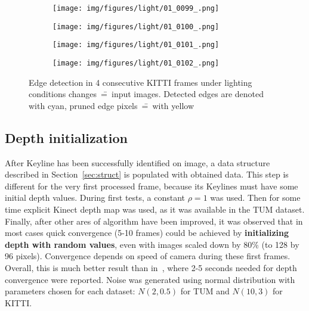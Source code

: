 \begin{figure}[hp]
	\centering
	\begin{subfigure}{1\textwidth}
		\centering
		\centering\texttt{[image: img/figures/light/01\_0099\_.png]}
		\subcaption{\label{fig:light2_a}}
	\end{subfigure}
	\begin{subfigure}{1\textwidth}
		\centering
		\centering\texttt{[image: img/figures/light/01\_0100\_.png]}
		\subcaption{\label{fig:light2_b}}
	\end{subfigure}
	\begin{subfigure}{1\textwidth}
		\centering
		\centering\texttt{[image: img/figures/light/01\_0101\_.png]}
		\subcaption{\label{fig:light2_c}}
	\end{subfigure}
	\begin{subfigure}{1\textwidth}
		\centering
		\centering\texttt{[image: img/figures/light/01\_0102\_.png]}
		\subcaption{\label{fig:light2_d}}
	\end{subfigure}
	
	\caption{\label{fig:light2}Edge detection in 4 consecutive KITTI \cite{kitti} frames under lighting conditions changes~\==~input images. Detected edges are denoted with cyan, pruned edge pixels~\==~with yellow}
\end{figure}



\subsection{Depth initialization}

After Keyline has been successfully identified on image, a data structure described in Section~\ref{sec:struct} is populated with obtained data. This step is different for the very first processed frame, because its Keylines must have some initial depth values. During first tests, a constant $\rho = 1$ was used. Then for some time explicit Kinect depth map was used, as it was available in the TUM dataset. Finally, after other ares of algorithm have been improved, it was observed that in most cases quick convergence (5-10 frames) could be achieved by \textbf{initializing depth with random values}, even with images scaled down by 80\% (to 128 by 96 pixels). Convergence depends on speed of camera during these first frames. Overall, this is much better result than in~\cite{jose2015realtime}, where 2-5 seconds needed for depth convergence were reported. Noise was generated using normal distribution with parameters chosen for each dataset: $N(2,0.5)$ for TUM and $N(10,3)$ for KITTI.


